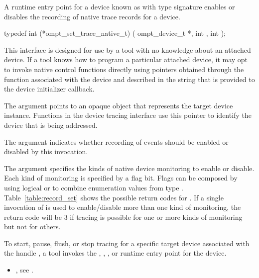 \label{sec:ompt_set_trace_native_t}

\summary
A runtime entry point for a device known as 
with type signature 
enables or disables the recording of native trace records for a device.


\format
\begin{ccppspecific}
\begin{omptInquiry}
typedef int (*ompt_set_trace_native_t) (
  ompt_device_t *,
  int ,
  int 
);
\end{omptInquiry}
\end{ccppspecific}

\descr
This interface is designed for use by a tool with no knowledge about
an attached device. If a tool knows how to program a particular
attached device, it may opt to invoke native control functions
directly using pointers obtained through the  function
associated with the device and described in the 
string that is provided to the device initializer callback.

\argdesc
The  argument points to an opaque object that represents
the target device instance. Functions in the device tracing interface
use this pointer to identify the device that is being addressed.

The argument  indicates whether recording of events
should be enabled or disabled by this invocation.

The argument  specifies the kinds of native device
monitoring to enable or disable.
Each kind of monitoring is specified by a flag bit.
Flags can be composed by using logical {\ttfamily or}  to combine enumeration
values from type .
Table~\ref{table:record_set} shows the possible return codes for
.  If a single invocation of
 is used to enable/disable more
than one kind of monitoring, the return code will be 3 if tracing
is possible for one or more kinds of monitoring but not for others.

To start, pause, flush, or stop tracing for a specific target device
associated with the handle , a tool invokes the 
, , , or
 runtime entry point for the device.


\crossreferences
\begin{itemize}
\item {},
see .
\end{itemize}

